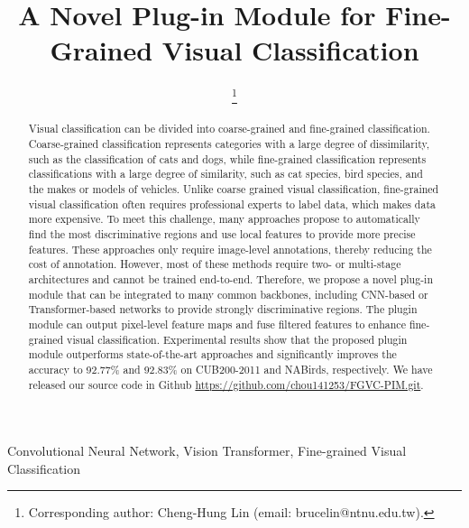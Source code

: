 \documentclass[conference]{IEEEtran}
\begin{document}
\title{A Novel Plug-in Module for Fine-Grained Visual Classification}


\author{
\thanks{Corresponding author: Cheng-Hung Lin (email: brucelin@ntnu.edu.tw).}}


\maketitle

\begin{abstract}
Visual classification can be divided into coarse-grained and fine-grained classification. Coarse-grained classification represents categories with a large degree of dissimilarity, such as the classification of cats and dogs, while fine-grained classification represents classifications with a large degree of similarity, such as cat species, bird species, and the makes or models of vehicles. Unlike coarse grained visual classification, fine-grained visual classification often requires professional experts to label data, which makes data more expensive. To meet this challenge, many approaches propose to automatically find the most discriminative regions and use local features to provide more precise features. These approaches only require image-level annotations, thereby reducing the cost of annotation. However, most of these methods require two- or multi-stage architectures and cannot be trained end-to-end. Therefore, we propose a novel plug-in module that can be integrated to many common backbones, including CNN-based or Transformer-based networks to provide strongly discriminative regions. The plugin module can output pixel-level feature maps and fuse filtered features to enhance fine-grained visual classification. Experimental results show that the proposed plugin module outperforms state-of-the-art approaches and significantly improves the accuracy to 92.77\% and 92.83\% on CUB200-2011 and NABirds, respectively. We have released our source code in Github \url{https://github.com/chou141253/FGVC-PIM.git}.

\end{abstract}

\begin{IEEEkeywords}
Convolutional Neural Network, Vision Transformer, Fine-grained Visual Classification
\end{IEEEkeywords}
\end{document}
